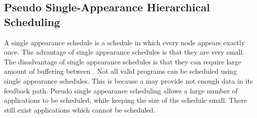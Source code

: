 \subsection{Pseudo Single-Appearance Hierarchical Scheduling}
\label{sec:sas}

\begin{comment}
\begin{figure}
\begin{minipage}{1.5in}
\centering \psfig{figure=pipeline-steady-state.eps,width=0.6in} \\
{\protect\small (a) A sample {\pipeline}}
\end{minipage}
~
\begin{minipage}{1.5in}
\centering \psfig{figure=splitjoin-steady-state.eps,width=1.2in} \\
{\protect\small (b) A sample {\splitjoin}}
\end{minipage}
~
\begin{minipage}{2.5in}
\centering \psfig{figure=feedback-hierarchical.eps,width=1.0in} \\
{\protect\small (c) A sample {{\feedbackloop}}.\\ $delay_{fl} = 15$ \\
The $L$ {\filter} has been flipped upside-down for clarity. \\$e_L
= 9, o_L = 5, u_L = 6$ }
\end{minipage}
\caption{Sample {\StreamIt} streams used for Pseudo
Single-Appearance Hierarchical Scheduling}
\label{fig:hierarchical-schedule}
\end{figure}
\end{comment}

A single appearance schedule is a schedule in which every node
appears exactly once. The advantage of single appearance schedules
is that they are very small. The disadvantage of single appearance
schedules is that they can require large amount of buffering
between {\filters}. Not all valid {\StreamIt} programs can be
scheduled using single appearance schedules. This is because a
{\feedbackloop} may provide not enough data in its feedback path.
Pseudo single appearance scheduling allows a large number of
applications to be scheduled, while keeping the size of the
schedule small. There still exist applications which cannot be
scheduled.


